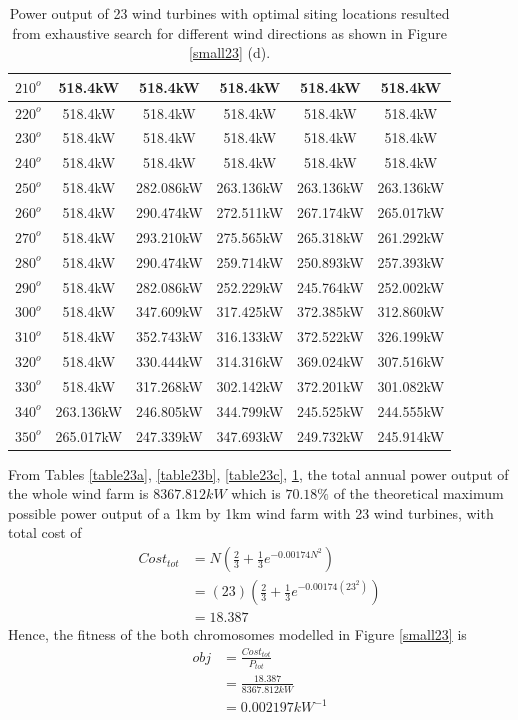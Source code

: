 \begin{table}[H]
\begin{tabular}{|c|c|c|c|c|c|}
		$210^o$	& 518.4kW	& 518.4kW	& 518.4kW	& 518.4kW	& 518.4kW	\\ \hline
		$220^o$	& 518.4kW	& 518.4kW	& 518.4kW	& 518.4kW	& 518.4kW	\\ \hline
		$230^o$	& 518.4kW	& 518.4kW	& 518.4kW	& 518.4kW	& 518.4kW	\\ \hline
		$240^o$	& 518.4kW	& 518.4kW	& 518.4kW	& 518.4kW	& 518.4kW	\\ \hline
		$250^o$	& 518.4kW	& 282.086kW	& 263.136kW	& 263.136kW	& 263.136kW	\\ \hline
		$260^o$	& 518.4kW	& 290.474kW	& 272.511kW	& 267.174kW	& 265.017kW	\\ \hline
		$270^o$	& 518.4kW	& 293.210kW	& 275.565kW	& 265.318kW	& 261.292kW	\\ \hline
		$280^o$	& 518.4kW	& 290.474kW	& 259.714kW	& 250.893kW	& 257.393kW	\\ \hline
		$290^o$	& 518.4kW	& 282.086kW	& 252.229kW	& 245.764kW	& 252.002kW	\\ \hline
		$300^o$	& 518.4kW	& 347.609kW	& 317.425kW	& 372.385kW	& 312.860kW	\\ \hline
		$310^o$	& 518.4kW	& 352.743kW	& 316.133kW	& 372.522kW	& 326.199kW	\\ \hline
		$320^o$	& 518.4kW	& 330.444kW	& 314.316kW	& 369.024kW	& 307.516kW	\\ \hline
		$330^o$	& 518.4kW	& 317.268kW	& 302.142kW	& 372.201kW	& 301.082kW	\\ \hline
		$340^o$	& 263.136kW	& 246.805kW	& 344.799kW	& 245.525kW	& 244.555kW	\\ \hline
		$350^o$	& 265.017kW	& 247.339kW	& 347.693kW	& 249.732kW	& 245.914kW	\\ \hline
        	\end{tabular}
        	\caption{Power output of 23 wind turbines with optimal siting locations resulted from exhaustive search for different wind directions as shown in Figure \ref{small23} (d).}
        	\label{table23d}
        \end{table}
        \doublespacing
        
        From Tables \ref{table23a}, \ref{table23b}, \ref{table23c}, \ref{table23d}, the total annual power output of the whole wind farm is $8367.812kW$ which is $70.18\%$ of the theoretical maximum possible power output of a 1km by 1km wind farm with 23 wind turbines, with total cost of
        \begin{align*}
            Cost_{tot}
            &= N\left(\frac{2}{3} + \frac{1}{3}e^{-0.00174N^2}\right) \\
            &= \left(23\right)\left(\frac{2}{3} + \frac{1}{3}e^{-0.00174\left(23^2\right)}\right) \\
            &=18.387
        \end{align*}
        Hence, the fitness of the both chromosomes modelled in Figure \ref{small23} is
        \begin{align*}
            obj
            &=\frac{Cost_{tot}}{P_{tot}} \\
            &=\frac{18.387}{8367.812kW} \\
            &=0.002197kW^{-1}
        \end{align*}
        
